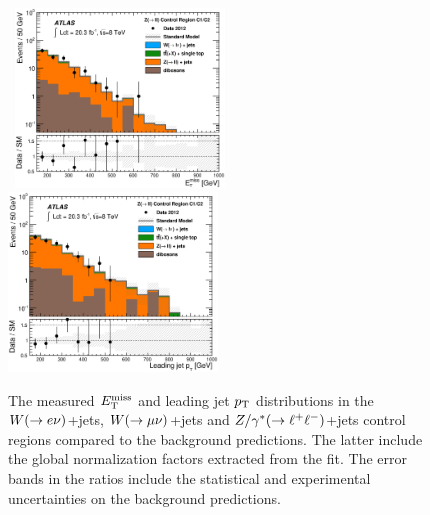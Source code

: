 \begin{figure}[!ht]
\begin{center}
{    }
    \mbox{
      \includegraphics[width=0.495\textwidth]{Appendix_CharmTagged/Figures/can_VR_Zll_C1_metnolep_final.eps}
      \includegraphics[width=0.495\textwidth]{Appendix_CharmTagged/Figures/can_VR_Zll_C1_jet1Pt_final.eps}
    }
  \end{center}
  \caption[$\met$ and leading jet $\pt$ distributions in the $\wen$+jets, $\wmn$+jets and $\zll$+jets control regions, after the normalization factors extracted from the fit have been applied.]{The measured $\met$ and leading jet $\pt$ distributions in the $\wen$+jets, $\wmn$+jets and $\zll$+jets control regions compared to the background predictions. The latter include the global normalization factors extracted from the fit. The error bands in the ratios include the statistical and experimental uncertainties on the background predictions.}
  \label{fig:Plot_CharmTagged_EW_Jetkinematics}
\end{figure}


